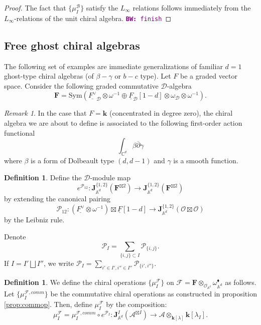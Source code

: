 \documentclass[11pt]{amsart}
\theoremstyle{definition}
\newtheorem{defn}[thm]{Definition}
\theoremstyle{remark}
\newtheorem{rem}[thm]{Remark}
\numberwithin{equation}{section}
\newcommand{\cF}{\mathcal{F}}
\def\BW#1{{\textcolor{purple}{{\tt {\bf BW:} #1}}}}
\begin{document}
\begin{proof}
  The fact that $\{\mu_I^{\mathcal{B}}\}$ satisfy the $L_\infty$ relations follows immediately from the
  $L_\infty$-relations of the unit chiral algebra.
  \BW{finish}
\end{proof}

\subsection{Free ghost chiral algebras}

The following set of examples are immediate generalizations of familiar $d=1$ ghost-type chiral algebras (of $\beta-\gamma$ or $b-c$
type).
Let $F$ be a graded vector space. 
Consider the following graded commutative $\mathcal{D}$-algebra
$$
\mathbf{F} =\mathrm{Sym}(\underline{F^{\vee}}_{\mathcal{D}}\otimes\omega^{-1}\oplus \underline{F}_{\mathcal{D}}[1-d]
\otimes\omega_{\mathcal{D}}\otimes\omega^{-1}).
$$

\begin{rem}
  In the case that $F=\mathbf{k}$ (concentrated in degree zero), the chiral algebra we are about to define is associated to the
  following first-order action functional
  \begin{equation}\label{}
    \int_{\mathbb{C}^d} \beta \overline{\partial} \gamma
  \end{equation}
  where $\beta$ is a form of Dolbeault type $(d,d-1)$ and $\gamma$ is a smooth function.
\end{rem}

\begin{defn}{\label{WickContraction}}
Define the $\mathcal{D}$-module map
$$
e^{\mathcal{P}_{12}}\colon \mathbf{J}^{\{1,2\}}_{\mathbb{A}^d}(\mathbf{F}^{\boxtimes 2})\rightarrow \mathbf{J}^{\{1,2\}}
_{\mathbb{A}^d}(\mathbf{F}^{\boxtimes 2})
$$
by extending the canonical pairing 
$$
\mathcal{P}_{12}\colon(\underline{F^{\vee}}\otimes\omega^{-1})\boxtimes \underline{F}[1-d]\rightarrow \mathbf{J}^{\{1,2\}}_{\mathbb{A}^d}(\mathcal{O}\boxtimes \mathcal{O})
$$
by the Leibniz rule.
\end{defn}

Denote $$ \mathcal{P}_{{I}}=\sum_{\{i,j\}\subset{I}}\mathcal{P}_{\{i,j\}}.
$$
If ${I}={I'}\bigsqcup {I''}$, we write ${\mathcal{P}}_{I}=\sum\limits_{i'\in {I'}, i''\in{I''} }\mathcal{P}_{\{i',i''\}}.$

\begin{defn}
  We define the chiral operations $\{\mu_I^{\mathcal{F}}\}$ on $\mathcal{F}=\mathbf{F}\otimes_{\mathcal{O}_{\mathbb{A}^d}} \omega_{\mathbb{A}^d}^{\blacklozenge}$ as follows.
  Let $\{\mu_I^{\cF,comm}\}$ be the commutative chiral operations as constructed in proposition \ref{prop:commop}.
  Then, define $\mu_I^{\mathcal{F}}$ by the composition:
$$
\mu^{\mathcal{F}}_{{I}}=\mu^{\mathcal{F},comm}_{I}\circ e^{\mathcal{P}_{{I}}} \colon \mathbf{J}_{\mathbb{A}^d}^{{I}}\left(\mathcal{A}^{\boxtimes{I}} \right)\rightarrow \mathcal{A}\otimes_{\mathbf{k}[\lambda]}\mathbf{k}[\lambda_{I}].
$$
\end{defn}
\end{document}
